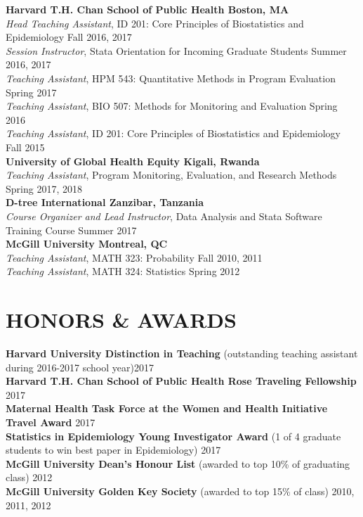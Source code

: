 \documentclass[12pt]{article}
\begin{document}
\textbf{Harvard T.H. Chan School of Public Health \hfill \hfill Boston, MA} \\
\textit{Head Teaching Assistant}, ID 201: Core Principles of Biostatistics and Epidemiology \hfill \hfill Fall 2016, 2017 \\
\textit{Session Instructor}, Stata Orientation for Incoming Graduate Students \hfill \hfill	Summer 2016, 2017 \\
\textit{Teaching Assistant}, HPM 543: Quantitative Methods in Program Evaluation \hfill \hfill Spring 2017 \\
\textit{Teaching Assistant}, BIO 507: Methods for Monitoring and Evaluation \hfill \hfill Spring 2016 \\
\textit{Teaching Assistant}, ID 201: Core Principles of Biostatistics and Epidemiology \hfill \hfill Fall 2015 \\

\textbf{University of Global Health Equity \hfill \hfill Kigali, Rwanda} \\
\textit{Teaching Assistant}, Program Monitoring, Evaluation, and Research Methods  \hfill \hfill Spring 2017, 2018 \\

\textbf{D-tree International \hfill \hfill Zanzibar, Tanzania}\\
\textit{Course Organizer and Lead Instructor}, Data Analysis and Stata Software Training Course \hfill \hfill Summer 2017  \\

\textbf{McGill University \hfill \hfill Montreal, QC}\\
\textit{Teaching Assistant}, MATH 323: Probability \hfill \hfill Fall 2010, 2011 \\
\textit{Teaching Assistant}, MATH 324: Statistics \hfill \hfill Spring 2012 

\section*{\textbf{{\Large H}{\small ONORS} {\Large \&} {\Large A}{\small WARDS}}}

\textbf{Harvard University Distinction in Teaching} {\footnotesize (outstanding teaching assistant during 2016-2017 school year)}\hfill \hfill	2017 \\
\textbf{Harvard T.H. Chan School of Public Health Rose Traveling Fellowship} \hfill \hfill	2017 \\
\textbf{Maternal Health Task Force at the Women and Health Initiative Travel Award} \hfill \hfill	2017 \\
\textbf{Statistics in Epidemiology Young Investigator Award} {\footnotesize (1 of 4 graduate students to win best paper in Epidemiology)}  \hfill \hfill	2017 \\
\textbf{McGill University Dean's Honour List} {\footnotesize (awarded to top 10\% of graduating class)}  \hfill \hfill	2012 \\
\textbf{McGill University Golden Key Society} {\footnotesize (awarded to top 15\% of class)}  \hfill \hfill2010, 2011, 2012 
\end{document}
